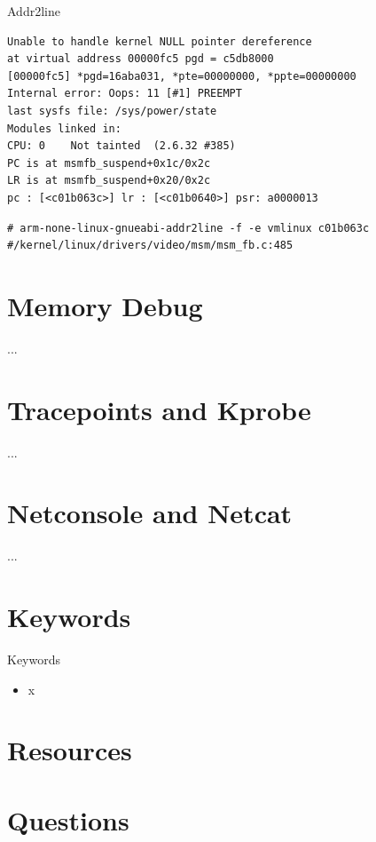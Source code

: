 \documentclass{workshop}
\begin{document}
\begin{frame}[fragile]{Addr2line}
\begin{verbatim}
Unable to handle kernel NULL pointer dereference
at virtual address 00000fc5 pgd = c5db8000
[00000fc5] *pgd=16aba031, *pte=00000000, *ppte=00000000
Internal error: Oops: 11 [#1] PREEMPT
last sysfs file: /sys/power/state
Modules linked in:
CPU: 0    Not tainted  (2.6.32 #385)
PC is at msmfb_suspend+0x1c/0x2c
LR is at msmfb_suspend+0x20/0x2c
pc : [<c01b063c>] lr : [<c01b0640>] psr: a0000013
\end{verbatim}

\begin{verbatim}
# arm-none-linux-gnueabi-addr2line -f -e vmlinux c01b063c
#/kernel/linux/drivers/video/msm/msm_fb.c:485
\end{verbatim}
\end{frame}

\section{Memory Debug}
\begin{frame}{...}
\end{frame}

\section{Tracepoints and Kprobe}
\begin{frame}{...}
\end{frame}

\section{Netconsole and Netcat}
\begin{frame}{...}
\end{frame}

\section{Keywords}
\begin{frame}{Keywords}
      \begin{itemize}
        \item x
      \end{itemize}
\end{frame}

\section{Resources}

\section{Questions}
\end{document}
